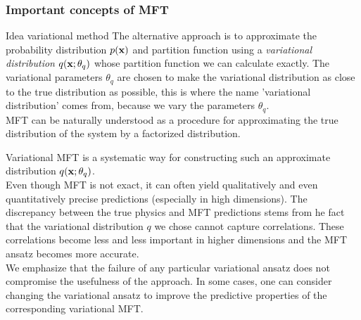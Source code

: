 \subsubsection{Important concepts of MFT}
\label{subsubsec:varMFTconcepts}
\begin{mybox}{Idea variational method}
The alternative approach is to approximate the probability distribution $p(\mathbf{x})$ and partition function using a \emph{variational distribution} $q(\mathbf{x};\theta_q)$ whose partition function we can calculate exactly. The variational parameters $\theta_q$ are chosen to make the variational distribution as close to the true distribution as possible, this is where the name ’variational distribution’ comes from, because we vary the parameters $\theta_q$.\\
MFT can be naturally understood as a procedure for approximating the true distribution of the system by a factorized distribution.
\end{mybox}
Variational MFT is a systematic way for constructing such an approximate distribution $q(\mathbf{x};\theta_q)$.\\
Even though MFT is not exact, it can often yield qualitatively and even quantitatively precise predictions (especially in high dimensions). The discrepancy between the true physics and MFT predictions stems from he fact that the variational distribution $q$ we chose cannot capture correlations. These correlations become less and less important in higher dimensions and the MFT ansatz becomes more accurate.\\
We emphasize that the failure of any particular variational ansatz does not compromise the usefulness of the approach. In some cases, one can consider changing the variational ansatz to improve the predictive properties of the corresponding variational MFT.

